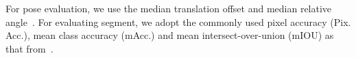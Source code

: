 \documentclass[10pt,twocolumn,letterpaper]{article}
\makeatletter
\newcommand{\equref}[1]{Eq\onedot~\eqref{#1}}
\newcommand{\tabref}[1]{Tab\onedot~\ref{#1}}
\newcommand{\ve}[1]{{\mathbf #1}} %
\DeclareRobustCommand\onedot{\futurelet\@let@token\@onedot}
\def\onedot{\ifx\@let@token.\else.\null\fi\xspace}
\def\ie{\emph{i.e.}}
\makeatother
\begin{document}
For pose evaluation, we use the median translation offset and median relative angle~\cite{Kendall_2015_ICCV}. For evaluating segment, we adopt the commonly used pixel accuracy (Pix. Acc.), mean class accuracy (mAcc.) and mean intersect-over-union (mIOU) as that from~\cite{WuSH16e}.
\end{document}
